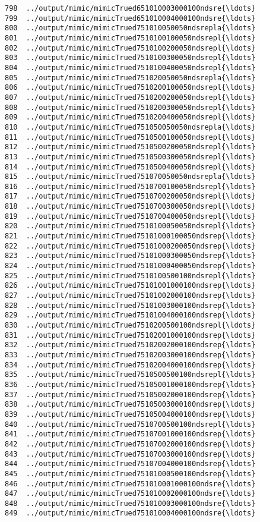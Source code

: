 \documentclass[11pt]{article}
\begin{document}
\begin{Verbatim}[commandchars=\\\{\}]
798  ../output/mimic/mimicTrued651010003000100ndsre{\ldots}  
799  ../output/mimic/mimicTrued651010004000100ndsre{\ldots}  
800  ../output/mimic/mimicTrued751010050050ndsrepla{\ldots}  
801  ../output/mimic/mimicTrued7510100100050ndsrepl{\ldots}  
802  ../output/mimic/mimicTrued7510100200050ndsrepl{\ldots}  
803  ../output/mimic/mimicTrued7510100300050ndsrepl{\ldots}  
804  ../output/mimic/mimicTrued7510100400050ndsrepl{\ldots}  
805  ../output/mimic/mimicTrued751020050050ndsrepla{\ldots}  
806  ../output/mimic/mimicTrued7510200100050ndsrepl{\ldots}  
807  ../output/mimic/mimicTrued7510200200050ndsrepl{\ldots}  
808  ../output/mimic/mimicTrued7510200300050ndsrepl{\ldots}  
809  ../output/mimic/mimicTrued7510200400050ndsrepl{\ldots}  
810  ../output/mimic/mimicTrued751050050050ndsrepla{\ldots}  
811  ../output/mimic/mimicTrued7510500100050ndsrepl{\ldots}  
812  ../output/mimic/mimicTrued7510500200050ndsrepl{\ldots}  
813  ../output/mimic/mimicTrued7510500300050ndsrepl{\ldots}  
814  ../output/mimic/mimicTrued7510500400050ndsrepl{\ldots}  
815  ../output/mimic/mimicTrued751070050050ndsrepla{\ldots}  
816  ../output/mimic/mimicTrued7510700100050ndsrepl{\ldots}  
817  ../output/mimic/mimicTrued7510700200050ndsrepl{\ldots}  
818  ../output/mimic/mimicTrued7510700300050ndsrepl{\ldots}  
819  ../output/mimic/mimicTrued7510700400050ndsrepl{\ldots}  
820  ../output/mimic/mimicTrued7510100050050ndsrepl{\ldots}  
821  ../output/mimic/mimicTrued75101000100050ndsrep{\ldots}  
822  ../output/mimic/mimicTrued75101000200050ndsrep{\ldots}  
823  ../output/mimic/mimicTrued75101000300050ndsrep{\ldots}  
824  ../output/mimic/mimicTrued75101000400050ndsrep{\ldots}  
825  ../output/mimic/mimicTrued7510100500100ndsrepl{\ldots}  
826  ../output/mimic/mimicTrued75101001000100ndsrep{\ldots}  
827  ../output/mimic/mimicTrued75101002000100ndsrep{\ldots}  
828  ../output/mimic/mimicTrued75101003000100ndsrep{\ldots}  
829  ../output/mimic/mimicTrued75101004000100ndsrep{\ldots}  
830  ../output/mimic/mimicTrued7510200500100ndsrepl{\ldots}  
831  ../output/mimic/mimicTrued75102001000100ndsrep{\ldots}  
832  ../output/mimic/mimicTrued75102002000100ndsrep{\ldots}  
833  ../output/mimic/mimicTrued75102003000100ndsrep{\ldots}  
834  ../output/mimic/mimicTrued75102004000100ndsrep{\ldots}  
835  ../output/mimic/mimicTrued7510500500100ndsrepl{\ldots}  
836  ../output/mimic/mimicTrued75105001000100ndsrep{\ldots}  
837  ../output/mimic/mimicTrued75105002000100ndsrep{\ldots}  
838  ../output/mimic/mimicTrued75105003000100ndsrep{\ldots}  
839  ../output/mimic/mimicTrued75105004000100ndsrep{\ldots}  
840  ../output/mimic/mimicTrued7510700500100ndsrepl{\ldots}  
841  ../output/mimic/mimicTrued75107001000100ndsrep{\ldots}  
842  ../output/mimic/mimicTrued75107002000100ndsrep{\ldots}  
843  ../output/mimic/mimicTrued75107003000100ndsrep{\ldots}  
844  ../output/mimic/mimicTrued75107004000100ndsrep{\ldots}  
845  ../output/mimic/mimicTrued75101000500100ndsrep{\ldots}  
846  ../output/mimic/mimicTrued751010001000100ndsre{\ldots}  
847  ../output/mimic/mimicTrued751010002000100ndsre{\ldots}  
848  ../output/mimic/mimicTrued751010003000100ndsre{\ldots}  
849  ../output/mimic/mimicTrued751010004000100ndsre{\ldots}  
    \end{Verbatim}
\end{document}
